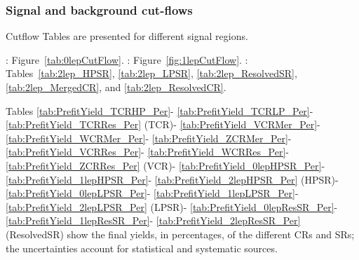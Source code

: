 \clearpage
\subsubsection{Signal and background cut-flows}
\label{subsec:cutflows}

Cutflow Tables are presented for different signal regions.

\zlep: Figure~\ref{tab:0lepCutFlow}.
\olep: Figure~\ref{fig:1lepCutFlow}.
\tlep: 
Tables~\ref{tab:2lep_HPSR},
\ref{tab:2lep_LPSR},
\ref{tab:2lep_ResolvedSR},
\ref{tab:2lep_MergedCR}, and
\ref{tab:2lep_ResolvedCR}.

Tables
\ref{tab:PrefitYield_TCRHP_Per}-
\ref{tab:PrefitYield_TCRLP_Per}-
\ref{tab:PrefitYield_TCRRes_Per} (TCR)-
\ref{tab:PrefitYield_VCRMer_Per}-
\ref{tab:PrefitYield_WCRMer_Per}-
\ref{tab:PrefitYield_ZCRMer_Per}-
\ref{tab:PrefitYield_VCRRes_Per}-
\ref{tab:PrefitYield_WCRRes_Per}-
\ref{tab:PrefitYield_ZCRRes_Per} (VCR)-
\ref{tab:PrefitYield_0lepHPSR_Per}-
\ref{tab:PrefitYield_1lepHPSR_Per}-
\ref{tab:PrefitYield_2lepHPSR_Per} (HPSR)-
\ref{tab:PrefitYield_0lepLPSR_Per}-
\ref{tab:PrefitYield_1lepLPSR_Per}-
\ref{tab:PrefitYield_2lepLPSR_Per} (LPSR)-
\ref{tab:PrefitYield_0lepResSR_Per}-
\ref{tab:PrefitYield_1lepResSR_Per}-
\ref{tab:PrefitYield_2lepResSR_Per} (ResolvedSR)
show the final yields, in percentages, of the different CRs and SRs; 
the uncertainties account for statistical and systematic sources.


